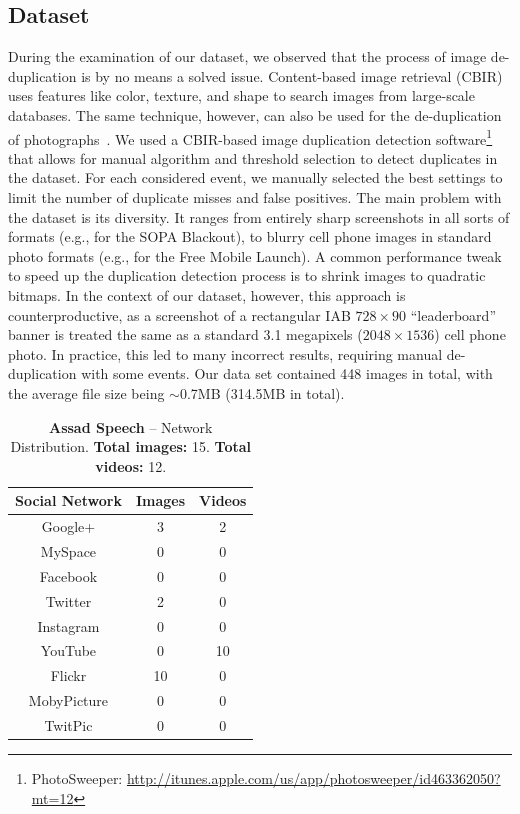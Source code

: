 \documentclass{acm_proc_article-sp}
\newcommand{\inlinelistingsize}{\fontsize{8pt}{11pt}}
\let\oldurl\url
\renewcommand{\url}[1]{\inlinelistingsize\oldurl{#1}}
\begin{document}
\subsection{Dataset}
During the examination of our dataset, we observed that the process of image de-duplication is by no means a solved issue.
Content-based image retrieval (CBIR) uses features like color, texture, and shape to search images from large-scale databases.
The same technique, however, can also be used for the de-duplication of photographs~\cite{Pattabhi2011}.
We used a CBIR-based image duplication detection software\footnote{PhotoSweeper: \url{http://itunes.apple.com/us/app/photosweeper/id463362050?mt=12}} that allows for manual algorithm and threshold selection to detect duplicates in the dataset.
For each considered event, we manually selected the best settings to limit the number of duplicate misses and false positives.
The main problem with the dataset is its diversity.
It ranges from entirely sharp screenshots in all sorts of formats (e.g., for the SOPA Blackout), to blurry cell phone images in standard photo formats (e.g., for the Free Mobile Launch).
A common performance tweak to speed up the duplication detection process is to shrink images to quadratic bitmaps.
In the context of our dataset, however, this approach is counterproductive, as a screenshot of a rectangular IAB $728 \times 90$ ``leaderboard'' banner is treated the same as a standard 3.1 megapixels ($2048 \times 1536$) cell phone photo.
In practice, this led to many incorrect results, requiring manual de-duplication with some events.
Our data set contained 448 images in total, with the average file size being $\sim$0.7MB (314.5MB in total).

\begin{table}[htbp]
  \begin{tabular}{ | c | c | c | }
    \hline
    \textbf{Social Network} & \textbf{Images} & \textbf{Videos}\\
    \hline
    Google+ & 3 & 2\\
    MySpace & 0 & 0\\
    Facebook & 0 & 0\\
    Twitter & 2 & 0\\
    Instagram & 0 & 0\\
    YouTube & 0 & 10\\
    Flickr & 10 & 0\\
    MobyPicture & 0 & 0\\
    TwitPic & 0 & 0\\
    \hline
  \end{tabular}
  \label{tab:assad}
  \caption{\textbf{Assad Speech} -- Network Distribution. \textbf{Total images:} 15. \textbf{Total videos:} 12.}
\end{table}
\end{document}
